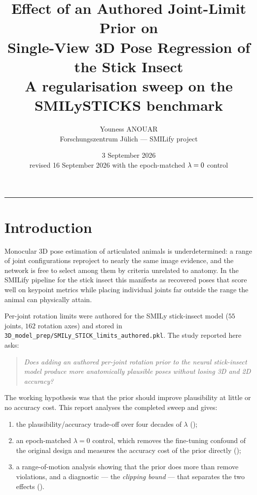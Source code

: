 \documentclass[11pt,a4paper]{article}
\title{\textbf{Effect of an Authored Joint-Limit Prior on\\
Single-View 3D Pose Regression of the Stick Insect}\\[0.4em]
\large A regularisation sweep on the SMILySTICKS benchmark}
\author{%
  Youness ANOUAR\\
  \small Forschungszentrum J\"ulich --- SMILify project
}
\date{3 September 2026 \\ \small revised 16 September 2026 with the epoch-matched $\lam = 0$ control}
\newcommand{\lam}{\lambda}
\begin{document}
\maketitle


\noindent\rule{\textwidth}{0.4pt}

\section{Introduction}
\label{sec:intro}

Monocular 3D pose estimation of articulated animals is underdetermined: a range
of joint configurations reproject to nearly the same image evidence, and the
network is free to select among them by criteria unrelated to anatomy. In the
SMILify pipeline for the stick insect this manifests as recovered poses that
score well on keypoint metrics while placing individual joints far outside the
range the animal can physically attain.

Per-joint rotation limits were authored for the SMILy stick-insect model
($55$ joints, $162$ rotation axes) and stored in
\texttt{3D\_model\_prep/SMILy\_STICK\_limits\_authored.pkl}. The study reported
here asks:

\begin{quote}
\emph{Does adding an authored per-joint rotation prior to the neural
stick-insect model produce more anatomically plausible poses without losing 3D
and 2D accuracy?}
\end{quote}

The working hypothesis was that the prior should improve plausibility at little
or no accuracy cost. This report analyses the completed sweep and gives:
\begin{enumerate}[nosep,leftmargin=1.6em]
  \item the plausibility/accuracy trade-off over four decades of $\lam$
        ();
  \item an epoch-matched $\lam = 0$ control, which removes the fine-tuning
        confound of the original design and measures the accuracy cost of the
        prior directly ();
  \item a range-of-motion analysis showing that the prior does more than remove
        violations, and a diagnostic --- the \emph{clipping bound} --- that
        separates the two effects ().
\end{enumerate}
\end{document}
